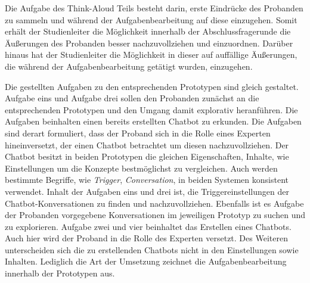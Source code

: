 Die Aufgabe des Think-Aloud Teils besteht darin, erste Eindrücke des Probanden zu sammeln und während der Aufgabenbearbeitung auf diese einzugehen. Somit erhält der Studienleiter die Möglichkeit innerhalb der Abschlussfragerunde die Äußerungen des Probanden besser nachzuvollziehen und einzuordnen. Darüber hinaus hat der Studienleiter die Möglichkeit in dieser auf auffällige Äußerungen, die während der Aufgabenbearbeitung getätigt wurden, einzugehen. 

Die gestellten Aufgaben zu den entsprechenden Prototypen sind gleich gestaltet. Aufgabe eins und Aufgabe drei sollen den Probanden zunächst an die entsprechenden Prototypen und den Umgang damit explorativ heranführen. Die Aufgaben beinhalten einen bereits erstellten Chatbot zu erkunden. Die Aufgaben sind derart formuliert, dass der Proband sich in die Rolle eines Experten hineinversetzt, der einen Chatbot betrachtet um diesen nachzuvollziehen. Der Chatbot besitzt in beiden Prototypen die gleichen Eigenschaften, Inhalte, wie Einstellungen um die Konzepte bestmöglichst zu vergleichen. Auch werden bestimmte Begriffe, wie \emph{Trigger}, \emph{Conversation}, in beiden Systemen konsistent verwendet. Inhalt der Aufgaben eins und drei ist, die Triggereinstellungen der Chatbot-Konversationen zu finden und nachzuvollziehen. Ebenfalls ist es Aufgabe der Probanden vorgegebene Konversationen im jeweiligen Prototyp zu suchen und zu explorieren. Aufgabe zwei und vier beinhaltet das Erstellen eines Chatbots. Auch hier wird der Proband in die Rolle des Experten versetzt. Des Weiteren unterscheiden sich die zu erstellenden Chatbots nicht in den Einstellungen sowie Inhalten. Lediglich die Art der Umsetzung zeichnet die Aufgabenbearbeitung innerhalb der Prototypen aus. 

